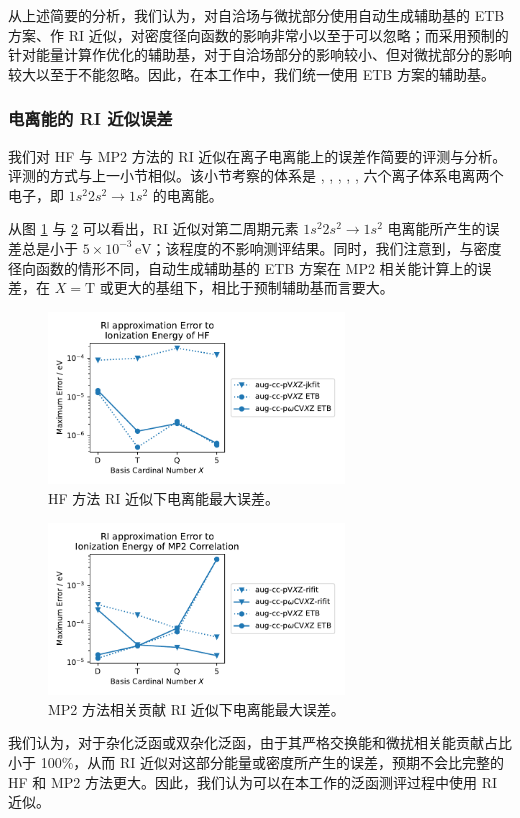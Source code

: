 从上述简要的分析，我们认为，对自洽场与微扰部分使用自动生成辅助基的 ETB 方案、作 RI 近似，对密度径向函数的影响非常小以至于可以忽略；而采用预制的针对能量计算作优化的辅助基，对于自洽场部分的影响较小、但对微扰部分的影响较大以至于不能忽略。因此，在本工作中，我们统一使用 ETB 方案的辅助基。

\subsubsection{电离能的 RI 近似误差}

我们对 HF 与 MP2 方法的 RI 近似在离子电离能上的误差作简要的评测与分析。评测的方式与上一小节相似。该小节考察的体系是 , , , , ,  六个离子体系电离两个电子，即 $1s^2 2s^2 \rightarrow 1s^2$ 的电离能。

从图 \ref{fig.HF-RI-eng} 与 \ref{fig.MP2-RI-eng} 可以看出，RI 近似对第二周期元素 $1s^2 2s^2 \rightarrow 1s^2$ 电离能所产生的误差总是小于 $5 \times 10^{-3} \, \text{eV}$；该程度的不影响测评结果。同时，我们注意到，与密度径向函数的情形不同，自动生成辅助基的 ETB 方案在 MP2 相关能计算上的误差，在 $X=\mathrm{T}$ 或更大的基组下，相比于预制辅助基而言要大。

\begin{figure}[hp]
    \centering
    \caption{HF 方法 RI 近似下电离能最大误差。}
    \label{fig.HF-RI-eng}
    \includegraphics[width=0.7\textwidth]{assets/HF-RI-eng.pdf}
\end{figure}

\begin{figure}[hp]
    \centering
    \caption{MP2 方法相关贡献 RI 近似下电离能最大误差。}
    \label{fig.MP2-RI-eng}
    \includegraphics[width=0.7\textwidth]{assets/MP2-RI-eng.pdf}
\end{figure}

我们认为，对于杂化泛函或双杂化泛函，由于其严格交换能和微扰相关能贡献占比小于 100\%，从而 RI 近似对这部分能量或密度所产生的误差，预期不会比完整的 HF 和 MP2 方法更大。因此，我们认为可以在本工作的泛函测评过程中使用 RI 近似。

\newpage





